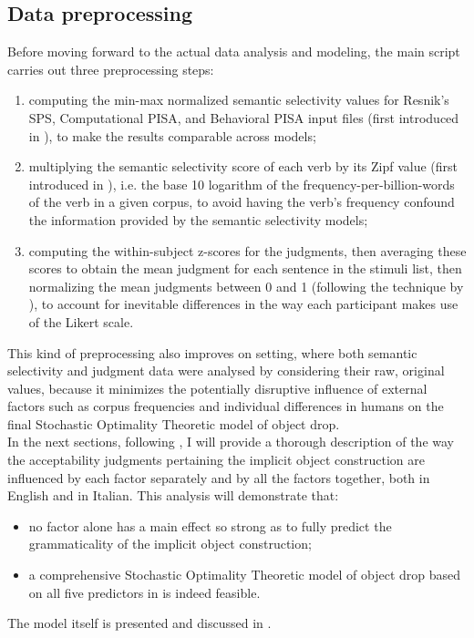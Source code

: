 \subsection{Data preprocessing} 

Before moving forward to the actual data analysis and modeling, the main script carries out three preprocessing steps:
\begin{enumerate}
    \item computing the min-max normalized semantic selectivity values for Resnik's SPS, Computational PISA, and Behavioral PISA input files (first introduced in ), to make the results comparable across models;
    \item multiplying the semantic selectivity score of each verb by its Zipf value (first introduced in ), i.e. the base 10 logarithm of the frequency-per-billion-words of the verb in a given corpus, to avoid having the verb's frequency confound the information provided by the semantic selectivity models;
    \item computing the within-subject z-scores for the judgments, then averaging these scores to obtain the mean judgment for each sentence in the stimuli list, then normalizing the mean judgments between 0 and 1 (following the technique by \textcite{KimEtAl2018, KimEtAl2019, KimEtAl2019a}), to account for inevitable differences in the way each participant makes use of the Likert scale.
\end{enumerate}

This kind of preprocessing also improves on  setting, where both semantic selectivity and judgment data were analysed by considering their raw, original values, because it minimizes the potentially disruptive influence of external factors such as corpus frequencies and individual differences in humans on the final Stochastic Optimality Theoretic model of object drop.\\
In the next sections, following \textcite{Medina2007}, I will provide a thorough description of the way the acceptability judgments pertaining the implicit object construction are influenced by each factor separately and by all the factors together, both in English and in Italian. This analysis will demonstrate that:
\begin{itemize}
    \item no factor alone has a main effect so strong as to fully predict the grammaticality of the implicit object construction;
    \item a comprehensive Stochastic Optimality Theoretic model of object drop based on all five predictors in  is indeed feasible.
\end{itemize}
The model itself is presented and discussed in .


